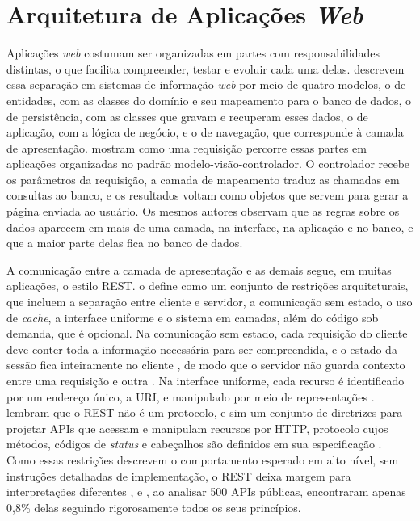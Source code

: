 \section{Arquitetura de Aplicações \textit{Web}}
\label{sec:arquitetura-web}

Aplicações \textit{web} costumam ser organizadas em partes com responsabilidades distintas, o que facilita compreender, testar e evoluir cada uma delas.
 descrevem essa separação em sistemas de informação \textit{web} por meio de quatro modelos, o de entidades, com as classes do
domínio e seu mapeamento para o banco de dados, o de persistência, com as classes que gravam e recuperam esses dados, o de aplicação, com a lógica de negócio,
e o de navegação, que corresponde à camada de apresentação.  mostram como uma requisição percorre essas partes em aplicações
organizadas no padrão modelo-visão-controlador. O controlador recebe os parâmetros da requisição, a camada de mapeamento traduz as chamadas em consultas ao
banco, e os resultados voltam como objetos que servem para gerar a página enviada ao usuário. Os mesmos autores observam que as regras sobre os dados aparecem
em mais de uma camada, na interface, na aplicação e no banco, e que a maior parte delas fica no banco de dados.

A comunicação entre a camada de apresentação e as demais segue, em muitas aplicações, o estilo REST.  o define como um
conjunto de restrições arquiteturais, que incluem a separação entre cliente e servidor, a comunicação sem estado, o uso de \textit{cache}, a interface uniforme
e o sistema em camadas, além do código sob demanda, que é opcional. Na comunicação sem estado, cada requisição do cliente deve conter toda a informação
necessária para ser compreendida, e o estado da sessão fica inteiramente no cliente \cite{Fielding2000}, de modo que o servidor não guarda contexto
entre uma requisição e outra \cite{Neumann2021}. Na interface uniforme, cada recurso é identificado por um endereço único, a URI, e manipulado por meio de
representações \cite{Neumann2021}.  lembram que o REST não é um protocolo, e sim um conjunto de diretrizes para projetar APIs que
acessam e manipulam recursos por HTTP, protocolo cujos métodos, códigos de \textit{status} e cabeçalhos são definidos em sua especificação
\cite{fielding2022http}. Como essas restrições descrevem o comportamento esperado em alto nível, sem instruções detalhadas de implementação, o REST deixa
margem para interpretações diferentes \cite{Kotstein2021}, e , ao analisar 500 APIs públicas, encontraram apenas 0,8\% delas
seguindo rigorosamente todos os seus princípios.

